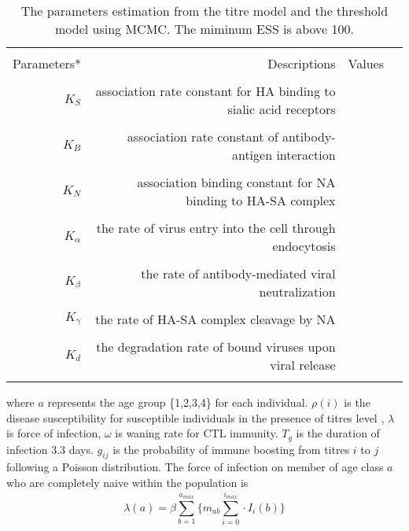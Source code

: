\documentclass{article}
\begin{document}
\clearpage
\begin{table}[ht]
\begin{minipage}{\textwidth}      
\centering %
\caption{The parameters estimation from the titre model and the threshold model using MCMC. The miminum ESS is above 100.}
\centering %
\begin{tabular}{rrrr}

\hline\hline \\%
Parameters* &          Descriptions &       Values \\ \\
\hline %
   
    $K_{S}$ &	   association rate constant for HA binding to sialic acid receptors	  \\ \\
    
    $K_{B}$ &      association rate constant of antibody-antigen interaction \\ \\
  
    $K_{N}$ &      association binding constant for NA binding to HA-SA complex \\ \\

    $K_{\alpha}$ & the rate of virus entry into the cell through endocytosis    \\ \\

    $K_{\beta}$ &  the rate of antibody-mediated viral neutralization  \\ \\

    $K_{\gamma}$ & the rate of HA-SA complex cleavage by NA &     \\ \\
  
    $K_{d}$ &      the degradation rate of bound viruses upon viral release  \\ \\

\hline
\end{tabular}
\end{minipage}
\end{table}


where $a$ represents the age group \{1,2,3,4\} for each individual. $\rho(i)$ is the disease susceptibility for susceptible individuals in the presence of titres level , $\lambda$ is force of infection, $\omega$ is waning rate for CTL immunity. $T_{g}$ is the duration of infection 3.3 days. $g_{ij}$ is the probability of immune boosting from titres $i$ to $j$ following a Poisson distribution. The force of infection on member of age class $a$ who are completely naive within the population is 
\begin{equation}
 \lambda(a)=\beta\sum_{b=1}^{a_{max}}{\Big\{m_{ab}\sum_{i=0}^{i_{max}}\cdot I_{i}(b)\Big\}}
\end{equation}
\end{document}
